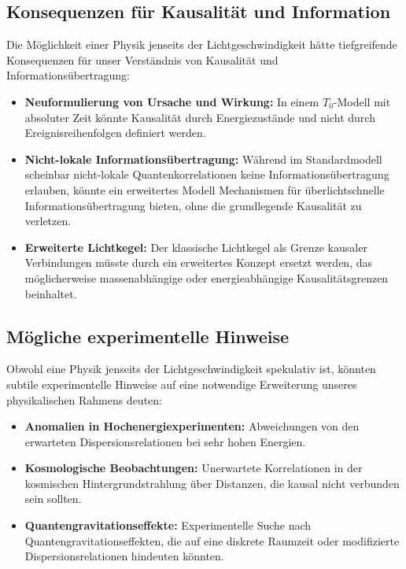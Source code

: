 \documentclass{article}
\begin{document}
	\subsection{Konsequenzen für Kausalität und Information}
	
	Die Möglichkeit einer Physik jenseits der Lichtgeschwindigkeit hätte tiefgreifende Konsequenzen für unser Verständnis von Kausalität und Informationsübertragung:
	
	\begin{itemize}
		\item \textbf{Neuformulierung von Ursache und Wirkung:} In einem $T_0$-Modell mit absoluter Zeit könnte Kausalität durch Energiezustände und nicht durch Ereignisreihenfolgen definiert werden.
		
		\item \textbf{Nicht-lokale Informationsübertragung:} Während im Standardmodell scheinbar nicht-lokale Quantenkorrelationen keine Informationsübertragung erlauben, könnte ein erweitertes Modell Mechanismen für überlichtschnelle Informationsübertragung bieten, ohne die grundlegende Kausalität zu verletzen.
		
		\item \textbf{Erweiterte Lichtkegel:} Der klassische Lichtkegel als Grenze kausaler Verbindungen müsste durch ein erweitertes Konzept ersetzt werden, das möglicherweise massenabhängige oder energieabhängige Kausalitätsgrenzen beinhaltet.
	\end{itemize}
	
	\subsection{Mögliche experimentelle Hinweise}
	
	Obwohl eine Physik jenseits der Lichtgeschwindigkeit spekulativ ist, könnten subtile experimentelle Hinweise auf eine notwendige Erweiterung unseres physikalischen Rahmens deuten:
	
	\begin{itemize}
		\item \textbf{Anomalien in Hochenergiexperimenten:} Abweichungen von den erwarteten Dispersionsrelationen bei sehr hohen Energien.
		
		\item \textbf{Kosmologische Beobachtungen:} Unerwartete Korrelationen in der kosmischen Hintergrundstrahlung über Distanzen, die kausal nicht verbunden sein sollten.
		
		\item \textbf{Quantengravitationseffekte:} Experimentelle Suche nach Quantengravitationseffekten, die auf eine diskrete Raumzeit oder modifizierte Dispersionsrelationen hindeuten könnten.
	\end{itemize}
	
\end{document}
